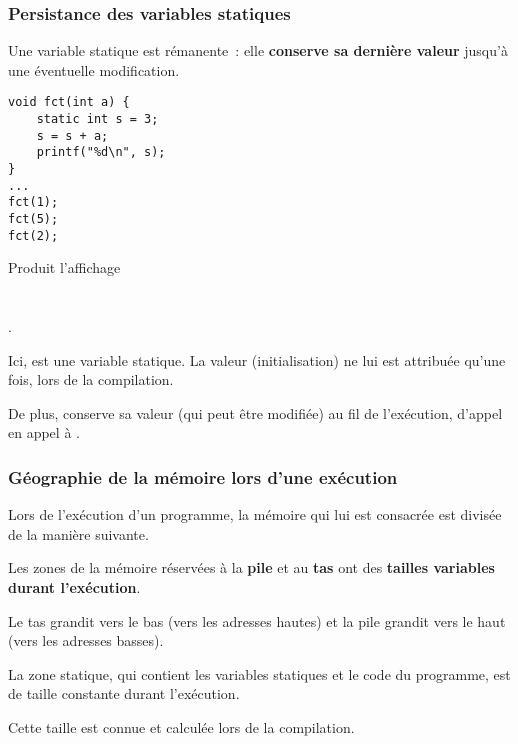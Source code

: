 \begin{frame}[fragile]
\frametitle{Persistance des variables statiques}
Une variable statique est \alert{rémanente}~: elle
{\bf conserve sa dernière valeur} jusqu'à une éventuelle modification.
\medskip

\begin{multicols}{2}
\begin{lstlisting}
void fct(int a) {
    static int s = 3;
    s = s + a;
    printf("%d\n", s);
}
...
fct(1);
fct(5);
fct(2);
\end{lstlisting}

\bigskip
\bigskip
\bigskip
\bigskip
Produit l'affichage \\
 \\
 \\
.
\end{multicols}

Ici,  est une variable statique. La valeur  (initialisation)
ne lui est attribuée qu'une fois, lors de la compilation.
\medskip

De plus,  conserve sa valeur (qui peut être modifiée) au fil
de l'exécution, d'appel en appel à .
\end{frame}

\begin{frame}[fragile]
\frametitle{Géographie de la mémoire lors d'une exécution}
Lors de l'exécution d'un programme, la mémoire qui lui est consacrée
est divisée de la manière suivante.
\begin{multicols}{2}
\begin{center}
\end{center}
Les zones de la mémoire réservées à la {\bf pile} et au {\bf tas} ont
des {\bf tailles variables durant l'exécution}.
\medskip

Le tas grandit vers le bas (vers les adresses hautes) et la pile grandit
vers le haut (vers les adresses basses).
\medskip

La \alert{zone statique}, qui contient les variables statiques et le
code du programme, est de \alert{taille constante durant l'exécution}.
\medskip

Cette taille est connue et calculée lors de la compilation.
\end{multicols}
\end{frame}

